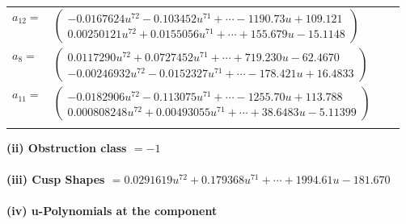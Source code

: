 \documentclass[1p]{elsarticle_modified}
\theoremstyle{definition}
\begin{document}
\begin{tabular}{m{7pt} m{180pt} m{7pt} m{180pt} }
\flushright $a_{12}=$&$\begin{pmatrix}-0.0167624 u^{72}-0.103452 u^{71}+\cdots-1190.73 u+109.121\\0.00250121 u^{72}+0.0155056 u^{71}+\cdots+155.679 u-15.1148\end{pmatrix}$ \\
\flushright $a_{8}=$&$\begin{pmatrix}0.0117290 u^{72}+0.0727452 u^{71}+\cdots+719.230 u-62.4670\\-0.00246932 u^{72}-0.0152327 u^{71}+\cdots-178.421 u+16.4833\end{pmatrix}$ \\
\flushright $a_{11}=$&$\begin{pmatrix}-0.0182906 u^{72}-0.113075 u^{71}+\cdots-1255.70 u+113.788\\0.000808248 u^{72}+0.00493055 u^{71}+\cdots+38.6483 u-5.11399\end{pmatrix}$\\&\end{tabular}
\flushleft \textbf{(ii) Obstruction class $= -1$}\\~\\
\flushleft \textbf{(iii) Cusp Shapes $= 0.0291619 u^{72}+0.179368 u^{71}+\cdots+1994.61 u-181.670$}\\~\\
\newpage\renewcommand{\arraystretch}{1}
\flushleft \textbf{(iv) u-Polynomials at the component}\newline \\
\end{document}
